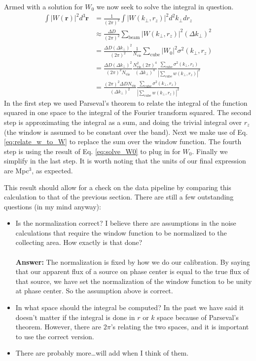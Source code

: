 \documentclass{article}
\begin{document}
Armed with a solution for $W_0$ we now seek to solve the integral in question.
\begin{subequations}
\begin{align}
\int |W(\mathbf{r})|^2 d^3 \mathbf{r} & = \frac{1}{(2\pi)^2} \int |W(k_{\perp},r_z)|^2 d^2k_{\perp}d r_z \\
& \approx \frac{\Delta D}{(2\pi)^2} \sum_{\text{beam}} |W(k_{\perp},r_z)|^2 (\Delta k_{\perp})^2 \\
& = \frac{\Delta D (\Delta k_{\perp})^2}{(2\pi)^2} \frac{1}{N_{\text{vis}}} \sum_{\text{cube}} |W_0|^2 \sigma^2(k_{\perp},r_z) \\
& = \frac{\Delta D (\Delta k_{\perp})^2}{(2\pi)^2 N_{\text{vis}}} \frac{N_{\text{vis}}^2(2\pi)^4}{(\Delta k_{\perp})^4} \frac{\sum_{\text{cube}} \sigma^2(k_{\perp},r_z)}{\left|\sum_{\text{cube}} w(k_{\perp},r_z)\right|^2}  \\
& = \frac{(2\pi)^2 \Delta D N_{\text{vis}}}{(\Delta k_{\perp})^2} \frac{\sum_{\text{cube}} \sigma^2(k_{\perp},r_z)}{\left|\sum_{\text{cube}} w(k_{\perp},r_z)\right|^2}
\end{align}
\end{subequations}
In the first step we used Parseval's theorem to relate the integral of the function squared in one space to the integral of the Fourier transform squared. The second step is approximating the integral as a sum, and doing the trivial integral over $r_z$ (the window is assumed to be constant over the band). Next we make use of Eq. \ref{eq:relate_w_to_W} to replace the sum over the window function. The fourth step is using the result of Eq. \ref{eq:solve_W0} to plug in for $W_0$. Finally we simplify in the last step. It is worth noting that the units of our final expression are Mpc$^3$, as expected.

This result should allow for a check on the data pipeline by comparing this calculation to that of the previous section. There are still a few outstanding questions (in my mind anyway):
\begin{itemize}
  \item Is the normalization correct? I believe there are assumptions in the noise calculations that require the window function to be normalized to the collecting area. How exactly is that done? \\ \\
 { \bf Answer:} The normalization is fixed by how we do our calibration. By saying that our apparent flux of a source on phase center is equal to the true flux of that source, we have set the normalization of the window function to be unity at phase center. So the assumption above is correct.
  \item In what space should the integral be computed? In the past we have said it doesn't matter if the integral is done in $r$ or $k$ space because of Parseval's theorem. However, there are $2\pi$'s relating the two spaces, and it is important to use the correct version.
  \item There are probably more\ldots will add when I think of them.
\end{itemize}
\end{document}
